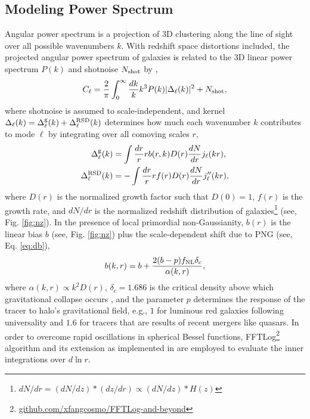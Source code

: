  \subsection{Modeling Power Spectrum}
Angular power spectrum is a projection of 3D clustering along the line of sight over all possible wavenumbers $k$. With redshift space distortions included, the projected angular power spectrum of galaxies is related to the 3D linear power spectrum $P(k)$ and shotnoise $N_{\rm shot}$ by \citep[see, e.g.,][]{Padmanabhan2007},
\begin{equation}\label{eq:cell}
    C_{\ell} = \frac{2}{\pi}\int_{0}^{\infty}\frac{dk}{k}k^{3}P(k)|\Delta_{\ell}(k)|^{2} + N_{\rm shot},
\end{equation}
where shotnoise is assumed to scale-independent, and kernel $\Delta_{\ell}(k) = \Delta^{\rm g}_{\ell}(k) + \Delta^{\rm RSD}_{\ell}(k)$ determines how much each wavenumber $k$ contributes to mode $\ell$ by integrating over all comoving scales $r$,
\begin{align}
    \Delta^{\rm g}_{\ell}(k) &= \int \frac{dr}{r} r b(r, k) D(r) \frac{dN}{dr} j_{\ell}(kr),\\
    \Delta^{\rm RSD}_{\ell}(k) &= - \int \frac{dr}{r} r f(r) D(r) \frac{dN}{dr} j^{\prime\prime}_{\ell}(kr),
\end{align}
where $D(r)$ is the normalized growth factor such that $D(0)=1$, $f(r)$ is the growth rate, and $dN/dr$ is the normalized redshift distribution of galaxies\footnote{$dN/dr = (dN/dz)*(dz/dr) \propto (dN/dz)*H(z)$} (see, Fig. \ref{fig:nz}). In the presence of local primordial non-Gaussianity, $b(r)$ is the linear bias $b$ (see, Fig. \ref{fig:nz}) plus the scale-dependent shift due to PNG (see, Eq. \ref{eq:db}),
\begin{equation}
b(k, r) = b + \frac{2 (b - p) f_{\rm NL} \delta_{c}}{\alpha (k, r)},
\end{equation}
where $\alpha(k,r) \propto k^{2}D(r)$, $\delta_{c}=1.686$ is the critical density above which gravitational collapse occurs \citep{fillmore1984self}, and the parameter $p$ determines the response of the tracer to halo's gravitational field, e.g., $1$ for luminous red galaxies following universality and $1.6$ for tracers that are results of recent mergers like quasars. In order to overcome rapid oscillations in spherical Bessel functions, FFTLog\footnote{\href{https://github.com/xfangcosmo/FFTLog-and-beyond}{github.com/xfangcosmo/FFTLog-and-beyond}} algorithm and its extension as implemented in \cite{fang2020beyond} are employed to evaluate the inner integrations over $d\ln r$.

